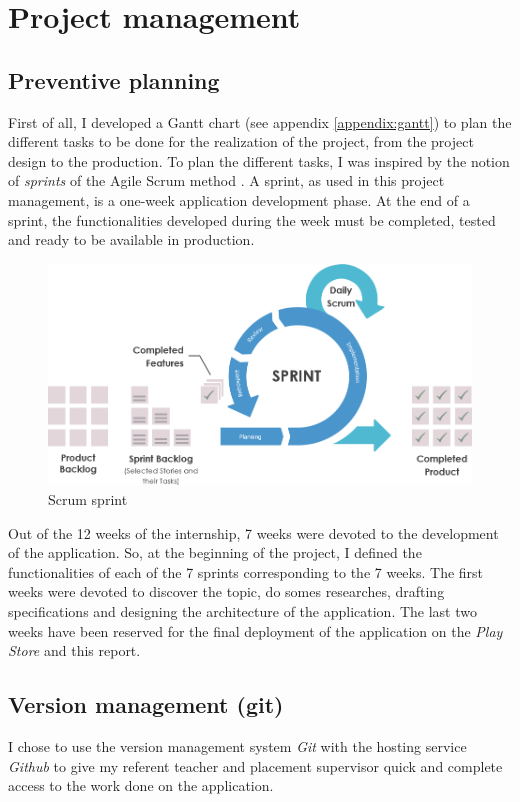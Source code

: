 \section{Project management}

\subsection{Preventive planning}
First of all, I developed a Gantt chart (see appendix \ref{appendix:gantt}) to plan the different tasks to be done for the realization of the project, from the project design to the production. To plan the different tasks, I was inspired by the notion of \textit{sprints} of the Agile Scrum method \cite{scrum}. A sprint, as used in this project management, is a one-week application development phase. At the end of a sprint, the functionalities developed during the week must be completed, tested and ready to be available in production.

\begin{figure}
  \includegraphics[width=.7\linewidth]{content/imgs/scrum_sprint.png}
  \caption{Scrum sprint}
\end{figure}

Out of the 12 weeks of the internship, 7 weeks were devoted to the development of the application. So, at the beginning of the project, I defined the functionalities of each of the 7 sprints corresponding to the 7 weeks. The first weeks were devoted to discover the topic, do somes researches, drafting specifications and designing the architecture of the application. The last two weeks have been reserved for the final deployment of the application on the \textit{Play Store} and this report.



\subsection{Version management (git)}

I chose to use the version management system \textit{Git} with the hosting service \textit{Github} to give my referent teacher and placement supervisor quick and complete access to the work done on the application.

